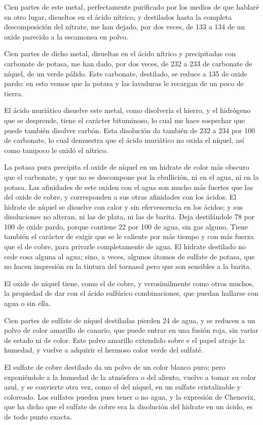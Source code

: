 \documentclass[a4paper, 11pt, oneside, polutonikogreek, spanish]{article}
\begin{document}
Cien partes de este metal, perfectamente purificado por los medios de que hablaré en otro lugar, disueltos en el ácido nítrico, y destilados hasta la completa descomposición del nítrate, me han dejado, por dos veces, de 133 a 134 de un oxide parecido a la escamonea en polvo.

Cien partes de dicho metal, disueltas en el ácido nítrico y precipitadas con carbonate de potasa, me han dado, por dos veces, de 232 a 233 de carbonate de níquel, de un verde pálido. Este carbonate, destilado, se reduce a 135 de oxide pardo: en esto vemos que la potasa y las lavaduras le recargan de un poco de tierra.

El ácido muriático disuelve este metal, como disolvería el hierro, y el hidrógeno que se desprende, tiene el carácter bituminoso, lo cual me hace sospechar que puede también disolver carbón. Esta disolución da también de 232 a 234 por 100 de carbonate, lo cual demuestra que el ácido muriático no oxida el níquel, así como tampoco le oxidó el nítrico.

La potasa pura precipita el oxide de níquel en un hidrate de color más obscuro que el carbonate, y que no se descompone por la ebullición, ni en el agua, ni en la potasa. Las afinidades de este oxiden con el agua son mucho más fuertes que las del oxide de cobre, y corresponden a sus otras afinidades con los ácidos. El hidrate de níquel se disuelve con calor y sin efervescencia en los ácidos; y sus disoluciones no alteran, ni las de plata, ni las de barita. Deja destilándole 78 por 100 de oxide pardo, porque contiene 22 por 100 de agua, sin gas alguno. Tiene también el carácter de exigir que se le caliente por más tiempo y con más fuerza que el de cobre, para privarle completamente de agua. El hidrate destilado no cede cosa alguna al agua; sino, a veces, algunos átomos de sulfate de potasa, que no hacen impresión en la tintura del tornasol pero que son sensibles a la barita.

El oxide de níquel tiene, como el de cobre, y verosímilmente como otros muchos, la propiedad de dar con el ácido sulfúrico combinaciones, que puedan hallarse con agua o sin ella.

Cien partes de sulfate de níquel destiladas pierden 24 de agua, y se reducen a un polvo de color amarillo de canario, que puede entrar en una fusión roja, sin variar de estado ni de color. Este polvo amarillo extendido sobre e el papel atraje la humedad, y vuelve a adquirir el hermoso color verde del sulfaté.

El sulfate de cobre destilado da un polvo de un color blanco puro; pero exponiéndole a la humedad de la atmósfera o del aliento, vuelve a tomar su color azul, y se convierte otra vez, como el del níquel, en un sulfate cristalizable y coloreado. Los sulfates pueden pues tener o no agua, y la expresión de Chenevix, que ha dicho que el sulfate de cobre era la disolución del hidrate en un ácido, es de todo punto exacta.
\end{document}
